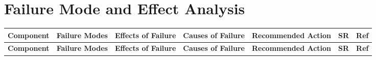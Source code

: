 \documentclass{article}
\begin{document}
\section{Failure Mode and Effect Analysis}
\begin{landscape}
  \begin{longtable}{|p{2.5cm}|p{4cm}|p{4cm}|p{4cm}|p{4cm}|p{1.25cm}|p{1cm}|}
      \hline
      \textbf{Component} & \textbf{Failure Modes} & \textbf{Effects of Failure}
      & \textbf{Causes of Failure} & \textbf{Recommended Action} & \textbf{SR} &
      \textbf{Ref} \\
      \hline
      \endfirsthead
      
      \hline
      \textbf{Component} & \textbf{Failure Modes} & \textbf{Effects of Failure}
      & \textbf{Causes of Failure} & \textbf{Recommended Action} & \textbf{SR} &
      \textbf{Ref} \\
      \hline
      \endhead
      

\end{longtable}
\end{landscape}
\end{document}
